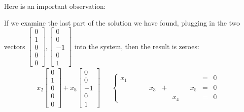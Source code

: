 \documentclass[11pt]{article}
\begin{document}
Here is an important observation:

If we examine the last part of the solution we have found, plugging in the two vectors $\begin{bmatrix}0\\1\\0\\0\\0\end{bmatrix}, \begin{bmatrix} 0\\0\\-1\\0\\1\end{bmatrix}$ into the system, then the result is zeroes:
\begin{align*}
x_2 \begin{bmatrix}0\\1\\0\\0\\0\end{bmatrix}
+ x_5 \begin{bmatrix}0\\0\\-1\\0\\1\end{bmatrix}
&&
\left\{
\begin{aligned}
x_1 &&&&&&&& &=& 0
\\
&&&&x_3 &+&&& x_5 &=& 0
\\
&&&&&&x_4 && &=& 0
\end{aligned}
\right.
\end{align*}
\end{document}
